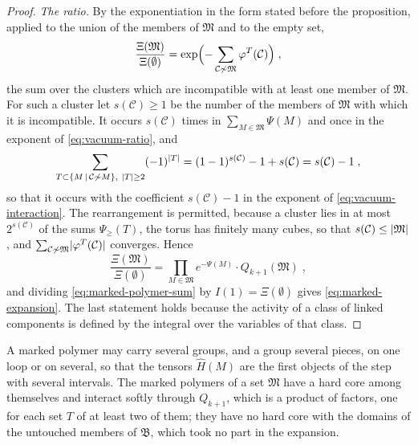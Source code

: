 \documentclass[11pt]{preprint}
\DeclarePairedDelimiter{\abs}{\lvert}{\rvert}
\numberwithin{equation}{section}
\theoremstyle{definition}
\theoremstyle{remark}
\theoremstyle{plain}
\begin{document}
\begin{proof}
\emph{The ratio.} By the exponentiation in the form stated before the proposition, applied to the union of the members of $\mathfrak M$ and to the empty set,
\begin{equation}\label{eq:vacuum-ratio}
    \frac{\Xi(\mathfrak M)}{\Xi(\emptyset)} = \exp\Bigl(-\sum_{\mathcal C \not\sim \mathfrak M}\varphi^T(\mathcal C)\Bigr)\;,
\end{equation}
the sum over the clusters which are incompatible with at least one member of $\mathfrak M$. For such a cluster let $s(\mathcal C) \geq 1$ be the number of the members of $\mathfrak M$ with which it is incompatible. It occurs $s(\mathcal C)$ times in $\sum_{M \in \mathfrak M}\Psi(M)$ and once in the exponent of \eqref{eq:vacuum-ratio}, and
\[
    \sum_{T \subset \{ M \,|\, \mathcal C \not\sim M \},\ \abs T \geq 2}(-1)^{\abs T} = (1 - 1)^{s(\mathcal C)} - 1 + s(\mathcal C) = s(\mathcal C) - 1\;,
\]
so that it occurs with the coefficient $s(\mathcal C) - 1$ in the exponent of \eqref{eq:vacuum-interaction}. The rearrangement is permitted, because a cluster lies in at most $2^{s(\mathcal C)}$ of the sums $\Psi_{\geq}(T)$, the torus has finitely many cubes, so that $s(\mathcal C) \leq \abs{\mathfrak M}$, and $\sum_{\mathcal C \not\sim \mathfrak M}\abs{\varphi^T(\mathcal C)}$ converges. Hence
\begin{equation}\label{eq:vacuum-ratio-split}
    \frac{\Xi(\mathfrak M)}{\Xi(\emptyset)} = \prod_{M \in \mathfrak M}e^{-\Psi(M)} \cdot Q_{k+1}(\mathfrak M)\;,
\end{equation}
and dividing \eqref{eq:marked-polymer-sum} by $I(1) = \Xi(\emptyset)$ gives \eqref{eq:marked-expansion}. The last statement holds because the activity of a class of linked components is defined by the integral over the variables of that class.
\end{proof}

A marked polymer may carry several groups, and a group several pieces, on one loop or on several, so that the tensors $\hat H(M)$ are the first objects of the step with several intervals. The marked polymers of a set $\mathfrak M$ have a hard core among themselves and interact softly through $Q_{k+1}$, which is a product of factors, one for each set $T$ of at least two of them; they have no hard core with the domains of the untouched members of $\mathfrak B$, which took no part in the expansion.
\end{document}
